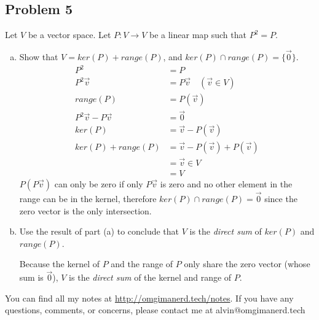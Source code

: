 \documentclass{math}
\begin{document}
\subsection*{Problem 5}
Let \( V \) be a vector space. Let \( P:V\to V \) be a linear map such that
\( P^2 = P \).
\begin{enumerate}[(a)]
  \item Show that \( V = ker(P)+range(P) \), and \( ker(P)\cap range(P) =
  \{\vec{0}\} \).
  \begin{align*}
    P^2 &= P \\
    P^2\vec{v} &= P\vec{v} \quad (\vec{v}\in V) \\
    range(P) &= P(\vec{v}) \\
    P^2\vec{v}-P\vec{v} &= \vec{0} \\
    ker(P) &= \vec{v}-P(\vec{v}) \\
    ker(P)+range(P) &= \vec{v}-P(\vec{v})+P(\vec{v}) \\
    &= \vec{v}\in V \\
    &= V
  \end{align*}
  \( P(P\vec{v}) \) can only be zero if only \( P\vec{v} \) is zero and no
  other element in the range can be in the kernel, therefore \( ker(P)\cap
  range(P) = \vec{0} \) since the zero vector is the only intersection.
  \item Use the result of part (a) to conclude that \( V \) is the
  \textit{direct sum} of \( ker(P) \) and \( range(P) \). \par
  Because the kernel of \( P \) and the range of \( P \) only share the zero
  vector (whose sum is \( \vec{0} \)), \( V \) is the \textit{direct sum} of
  the kernel and range of \( P \).
\end{enumerate}

\begin{center}
  You can find all my notes at \url{http://omgimanerd.tech/notes}. If you have
  any questions, comments, or concerns, please contact me at
  alvin@omgimanerd.tech
\end{center}
\end{document}

